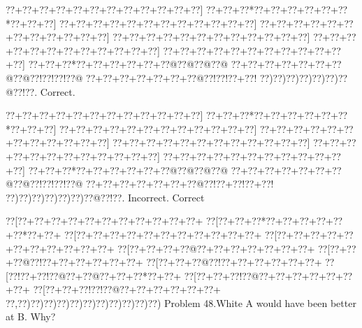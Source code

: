 \documentclass[a5paper]{article}
\begin{document}
\begin{center}
{\goo
\0??+\0??+\0??+\0??+\0??+\0??+\0??+\0??+\0??+\0??+\0??+\0??]
\0??+\0??+\0??*\0??+\0??+\0??+\0??+\0??+\0??*\0??+\0??+\0??]
\0??+\0??+\0??+\0??+\0??+\0??+\0??+\0??+\0??+\0??+\0??+\0??]
\0??+\0??+\0??+\0??+\0??+\0??+\0??+\0??+\0??+\0??+\0??+\0??]
\0??+\0??+\0??+\0??+\0??+\0??+\0??+\0??+\0??+\0??+\0??+\0??]
\0??+\0??+\0??+\0??+\0??+\0??+\0??+\0??+\0??+\0??+\0??+\0??]
\0??+\0??+\0??+\0??+\0??+\0??+\0??+\0??+\0??+\0??+\0??+\0??]
\0??+\0??+\0??*\0??+\0??+\0??+\0??+\0??+\0??@\0??@\0??@\0??@
\0??+\0??+\0??+\0??+\0??+\0??+\0??@\0??@\0??!\0??!\0??!\0??@
\0??+\0??+\0??+\0??+\0??+\0??+\0??@\0??!\0??!\0??+\0??!
\0??)\0??)\0??)\0??)\0??)\0??)\0??@\0??!\0??.
}
Correct. 

\end{center}
\begin{center}
{\goo
\0??+\0??+\0??+\0??+\0??+\0??+\0??+\0??+\0??+\0??+\0??+\0??]
\0??+\0??+\0??*\0??+\0??+\0??+\0??+\0??+\0??*\0??+\0??+\0??]
\0??+\0??+\0??+\0??+\0??+\0??+\0??+\0??+\0??+\0??+\0??+\0??]
\0??+\0??+\0??+\0??+\0??+\0??+\0??+\0??+\0??+\0??+\0??+\0??]
\0??+\0??+\0??+\0??+\0??+\0??+\0??+\0??+\0??+\0??+\0??+\0??]
\0??+\0??+\0??+\0??+\0??+\0??+\0??+\0??+\0??+\0??+\0??+\0??]
\0??+\0??+\0??+\0??+\0??+\0??+\0??+\0??+\0??+\0??+\0??+\0??]
\0??+\0??+\0??*\0??+\0??+\0??+\0??+\0??+\0??@\0??@\0??@\0??@
\0??+\0??+\0??+\0??+\0??+\0??+\0??@\0??@\0??!\0??!\0??!\0??@
\0??+\0??+\0??+\0??+\0??+\0??+\0??@\0??!\0??+\0??!\0??+\0??!
\0??)\0??)\0??)\0??)\0??)\0??)\0??@\0??!\0??.
}
Incorrect. Correct

\end{center}
\newpage
\begin{center}
{\goo
\0??[\0??+\0??+\0??+\0??+\0??+\0??+\0??+\0??+\0??+\0??+\0??+
\0??[\0??+\0??+\0??*\0??+\0??+\0??+\0??+\0??+\0??*\0??+\0??+
\0??[\0??+\0??+\0??+\0??+\0??+\0??+\0??+\0??+\0??+\0??+\0??+
\0??[\0??+\0??+\0??+\0??+\0??+\0??+\0??+\0??+\0??+\0??+\0??+
\0??[\0??+\0??+\0??+\0??@\0??+\0??+\0??+\0??+\0??+\0??+\0??+
\0??[\0??+\0??+\0??@\0??!\0??+\0??+\0??+\0??+\0??+\0??+
\0??[\0??+\0??+\0??@\0??!\0??+\0??+\0??+\0??+\0??+\0??+
\0??[\0??!\0??+\0??!\0??@\0??+\0??@\0??+\0??+\0??*\0??+\0??+
\0??[\0??+\0??+\0??!\0??@\0??+\0??+\0??+\0??+\0??+\0??+\0??+
\0??[\0??+\0??+\0??!\0??!\0??@\0??+\0??+\0??+\0??+\0??+\0??+
\0??,\0??)\0??)\0??)\0??)\0??)\0??)\0??)\0??)\0??)\0??)\0??)
}
Problem 48.White A would have been better at B. Why?

\end{center}
\end{document}
